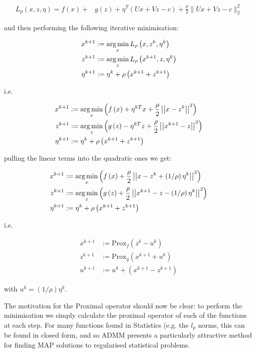 \begin{align*}
L_p\left(x, z, \eta\right) = f\left( x\right) +& g\left(z\right)+\eta^T\left(Ux+Vz-c\right) + \frac{\rho}{2}\|Ux+Vz-c\|_2^2
\end{align*}

and then performing the following iterative minimisation:

\begin{align}
x^{k+1} &:= \operatorname*{arg\,min}_{x} L_\rho\left(x,z^k,\eta^k\right)\\
z^{k+1} &:= \operatorname*{arg\,min}_{z} L_\rho\left(x^{k+1},z,\eta^k\right)\\
\eta^{k+1} &:= \eta^{k} + \rho \left(x^{k+1} + z^{k+1}\right)
\end{align}

i.e. 

\begin{align}
x^{k+1} &:= \operatorname*{arg\,min}_{x} \left( f\left(x\right) + \eta^{kT}x + \frac{\rho}{2}\left|\left|x - z^k\right|\right|^2 \right) \\
z^{k+1} &:= \operatorname*{arg\,min}_{z} \left( g\left(z\right) - \eta^{kT}z + \frac{\rho}{2}\left|\left|x^{k+1} - z\right|\right|^2 \right)\\
\eta^{k+1} &:= \eta^{k} + \rho \left(x^{k+1} + z^{k+1}\right)
\end{align}

pulling the linear terms into the quadratic ones we get:

\begin{align}
x^{k+1} &:= \operatorname*{arg\,min}_{x} \left( f\left(x\right) +  \frac{\rho}{2}\left|\left|x - z^k + \left(1/\rho\right)\eta^k\right|\right|^2 \right) \\
z^{k+1} &:= \operatorname*{arg\,min}_{z} \left( g\left(z\right) +  \frac{\rho}{2}\left|\left|x^{k+1} - z - \left(1/\rho\right)\eta^k\right|\right|^2 \right)\\
\eta^{k+1} &:= \eta^{k} + \rho \left(x^{k+1} + z^{k+1}\right)
\end{align}

i.e.

\begin{align}
x^{k+1} &:= \mathrm{Prox}_f \left( z^k - u^k\right)\\
z^{k+1} &:= \mathrm{Prox}_g \left(x^{k+1} + u^k\right)  \\
u^{k+1} &:= u^{k} + \left(x^{k+1} - z^{k+1}\right)
\end{align}

with \(u^k = \left(1/\rho\right) \eta^k\).

The motivation for the Proximal operator should now be clear: to perform the minimisation we simply calculate the proximal operator of each of the functions at each step. For many functions found in Statistics (e.g. the \(l_p\) norms, this can be found in closed form, and so ADMM presents a particularly attractive method for finding MAP solutions to regularised statistical problems.


